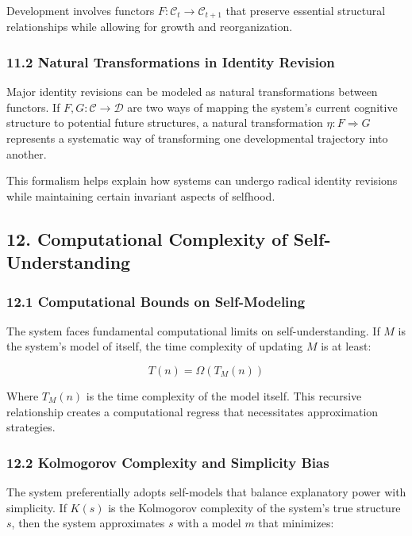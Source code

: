 \documentclass[
]{article}
\begin{document}
Development involves functors
\(F: \mathcal{C}_t \rightarrow \mathcal{C}_{t+1}\) that preserve
essential structural relationships while allowing for growth and
reorganization.

\subsubsection{11.2 Natural Transformations in Identity
Revision}\label{natural-transformations-in-identity-revision}

Major identity revisions can be modeled as natural transformations
between functors. If \(F, G: \mathcal{C} \rightarrow \mathcal{D}\) are
two ways of mapping the system's current cognitive structure to
potential future structures, a natural transformation
\(\eta: F \Rightarrow G\) represents a systematic way of transforming
one developmental trajectory into another.

This formalism helps explain how systems can undergo radical identity
revisions while maintaining certain invariant aspects of selfhood.

\subsection{12. Computational Complexity of
Self-Understanding}\label{computational-complexity-of-self-understanding}

\subsubsection{12.1 Computational Bounds on
Self-Modeling}\label{computational-bounds-on-self-modeling}

The system faces fundamental computational limits on self-understanding.
If \(M\) is the system's model of itself, the time complexity of
updating \(M\) is at least:

\[T(n) = \Omega(T_M(n))\]

Where \(T_M(n)\) is the time complexity of the model itself. This
recursive relationship creates a computational regress that necessitates
approximation strategies.

\subsubsection{12.2 Kolmogorov Complexity and Simplicity
Bias}\label{kolmogorov-complexity-and-simplicity-bias}

The system preferentially adopts self-models that balance explanatory
power with simplicity. If \(K(s)\) is the Kolmogorov complexity of the
system's true structure \(s\), then the system approximates \(s\) with a
model \(m\) that minimizes:
\end{document}
